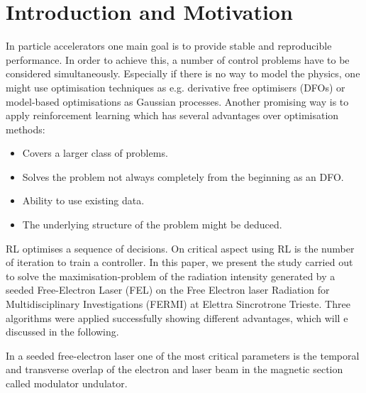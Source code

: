 \documentclass[
 reprint,
 amsmath,amssymb,amsfonts,clevref,
 aps,
prstab,
]{revtex4-2}
\begin{document}
\section{Introduction and Motivation}
In particle accelerators one main goal is to provide stable and reproducible performance. In order to achieve this, a number of control problems have to be considered simultaneously. Especially if there is no way to model the physics, one might use optimisation techniques as e.g. derivative free optimisers (DFOs) or model-based optimisations as Gaussian processes. Another promising way is to apply reinforcement learning which has several advantages over optimisation methods:
\begin{itemize}
    \item Covers a larger class of problems.
    \item Solves the problem not always completely from the beginning as an DFO.
    \item Ability to use existing data.
    \item The underlying structure of the problem might be deduced.
\end{itemize}
RL optimises a sequence of decisions. On critical aspect using RL is the number of iteration to train a controller.
In this paper, we present the study carried out to solve the maximisation-problem of the radiation intensity generated by a seeded Free-Electron Laser (FEL) on the Free Electron laser Radiation for Multidisciplinary Investigations (FERMI) at Elettra Sincrotrone Trieste. Three algorithms were applied successfully showing different advantages, which will e discussed in the following.


In a seeded free-electron laser one of the most critical parameters is the temporal and transverse overlap of the electron and laser beam in the magnetic section called modulator undulator. 
\end{document}
